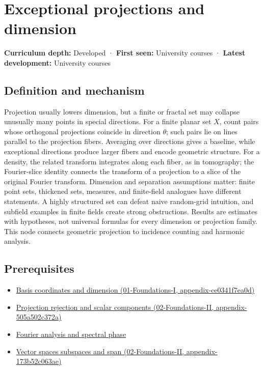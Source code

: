 \hypertarget{appendix-3c73f7862157}{}
\section{Exceptional projections and dimension}\label{appendix-3c73f7862157-exceptional-projections-and-dimension}

\textbf{Curriculum depth:} Developed · \textbf{First seen:} University courses · \textbf{Latest development:} University courses

\subsection{Definition and mechanism}\label{appendix-3c73f7862157-definition-and-mechanism}

Projection usually lowers dimension, but a finite or fractal set may collapse unusually many points in special directions. For a finite planar set \(X\), count pairs whose orthogonal projections coincide in direction \(\theta\); such pairs lie on lines parallel to the projection fibers. Averaging over directions gives a baseline, while exceptional directions produce larger fibers and encode geometric structure. For a density, the related transform integrates along each fiber, as in tomography; the Fourier-slice identity connects the transform of a projection to a slice of the original Fourier transform. Dimension and separation assumptions matter: finite point sets, thickened sets, measures, and finite-field analogues have different statements. A highly structured set can defeat naive random-grid intuition, and subfield examples in finite fields create strong obstructions. Results are estimates with hypotheses, not universal formulas for every dimension or projection family. This node connects geometric projection to incidence counting and harmonic analysis.

\subsection{Prerequisites}\label{appendix-3c73f7862157-prerequisites}

\begin{itemize}
\tightlist
\item
  \href{../01-Foundations-I/main.pdf\#nameddest=appendix-ce0341f7ea0d}{Basis coordinates and dimension (01-Foundations-I, appendix-ce0341f7ea0d)}
\item
  \href{../02-Foundations-II/main.pdf\#nameddest=appendix-505a502c372a}{Projection rejection and scalar components (02-Foundations-II, appendix-505a502c372a)}
\item
  \hyperref[appendix-b60686ba06a1]{Fourier analysis and spectral phase}
\item
  \href{../02-Foundations-II/main.pdf\#nameddest=appendix-173b52c063ae}{Vector spaces subspaces and span (02-Foundations-II, appendix-173b52c063ae)}
\end{itemize}


